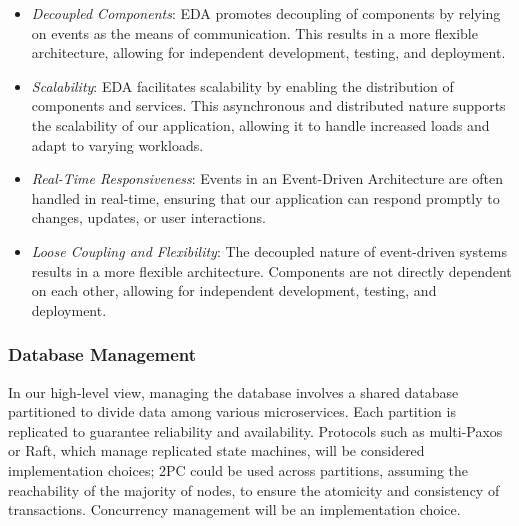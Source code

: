 \begin{itemize}
    \item \textit{Decoupled Components}: EDA promotes decoupling of components by relying on events as the means of communication. This results in a more flexible architecture, allowing for independent development, testing, and deployment.
  
    \item \textit{Scalability}: EDA facilitates scalability by enabling the distribution of components and services. This asynchronous and distributed nature supports the scalability of our application, allowing it to handle increased loads and adapt to varying workloads.
  
    \item \textit{Real-Time Responsiveness}: Events in an Event-Driven Architecture are often handled in real-time, ensuring that our application can respond promptly to changes, updates, or user interactions.
  
    \item \textit{Loose Coupling and Flexibility}: The decoupled nature of event-driven systems results in a more flexible architecture. Components are not directly dependent on each other, allowing for independent development, testing, and deployment.
\end{itemize}


\subsubsection{Database Management}

In our high-level view, managing the database involves a shared database partitioned to divide data among various microservices. Each partition is replicated to guarantee reliability and availability. Protocols such as multi-Paxos or Raft, which manage replicated state machines, will be considered implementation choices; 2PC could be used across partitions, assuming the reachability of the majority of nodes, to ensure the atomicity and consistency of transactions. Concurrency management will be an implementation choice.

